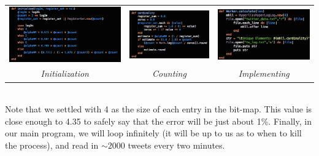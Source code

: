 \documentclass{article}
\begin{document}
\clearpage
\begin{center}
\begin{tabular}{c c c}
\includegraphics[scale=0.3]{twitter_problem/hll_init}
&
\includegraphics[scale=0.4]{twitter_problem/hll_count}
&
\includegraphics[scale=0.4]{twitter_problem/hll_imp}
\\
\textit{Initialization} & \textit{Counting} & \textit{Implementing}
\end{tabular}
\end{center}
\noindent \\
Note that we settled with 4 as the size of each entry in the bit-map. This value is close enough to 4.35 to safely say that the error will be just about 1\%.
Finally, in our main program, we will loop infinitely (it will be up to us as to when to kill the process), and read in $\sim 2000$ tweets every two minutes. 
\end{document}
